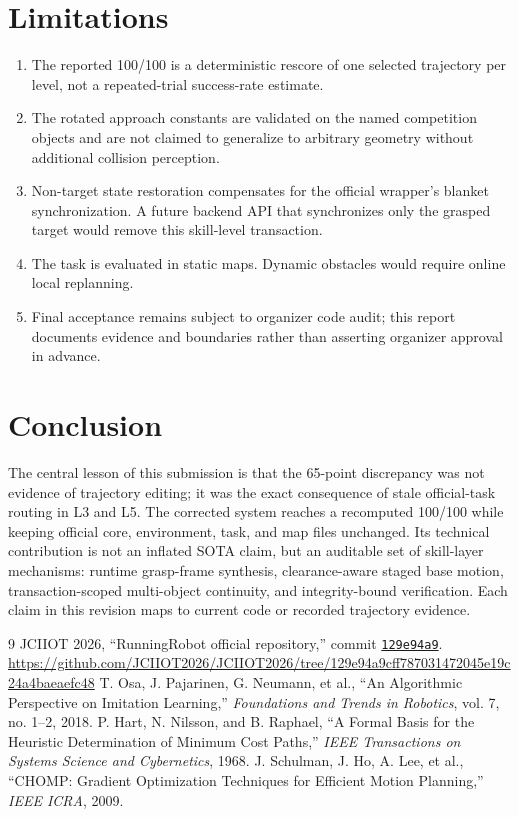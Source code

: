 \documentclass[11pt,a4paper]{article}
\newcommand{\commit}{\href{https://github.com/JCIIOT2026/JCIIOT2026/tree/129e94a9cff787031472045e19c24a4baeaefc48}{\texttt{129e94a9}}}
\begin{document}
\section{Limitations}

\begin{enumerate}
\item The reported 100/100 is a deterministic rescore of one selected trajectory per level, not a repeated-trial success-rate estimate.
\item The rotated approach constants are validated on the named competition objects and are not claimed to generalize to arbitrary geometry without additional collision perception.
\item Non-target state restoration compensates for the official wrapper's blanket synchronization. A future backend API that synchronizes only the grasped target would remove this skill-level transaction.
\item The task is evaluated in static maps. Dynamic obstacles would require online local replanning.
\item Final acceptance remains subject to organizer code audit; this report documents evidence and boundaries rather than asserting organizer approval in advance.
\end{enumerate}

\section{Conclusion}

The central lesson of this submission is that the 65-point discrepancy was not evidence of trajectory editing; it was the exact consequence of stale official-task routing in L3 and L5. The corrected system reaches a recomputed 100/100 while keeping official core, environment, task, and map files unchanged. Its technical contribution is not an inflated SOTA claim, but an auditable set of skill-layer mechanisms: runtime grasp-frame synthesis, clearance-aware staged base motion, transaction-scoped multi-object continuity, and integrity-bound verification. Each claim in this revision maps to current code or recorded trajectory evidence.

\begin{thebibliography}{9}
 JCIIOT 2026, ``RunningRobot official repository,'' commit \commit. \url{https://github.com/JCIIOT2026/JCIIOT2026/tree/129e94a9cff787031472045e19c24a4baeaefc48}
 T. Osa, J. Pajarinen, G. Neumann, et al., ``An Algorithmic Perspective on Imitation Learning,'' \textit{Foundations and Trends in Robotics}, vol. 7, no. 1--2, 2018.
 P. Hart, N. Nilsson, and B. Raphael, ``A Formal Basis for the Heuristic Determination of Minimum Cost Paths,'' \textit{IEEE Transactions on Systems Science and Cybernetics}, 1968.
 J. Schulman, J. Ho, A. Lee, et al., ``CHOMP: Gradient Optimization Techniques for Efficient Motion Planning,'' \textit{IEEE ICRA}, 2009.
\end{thebibliography}
\end{document}
